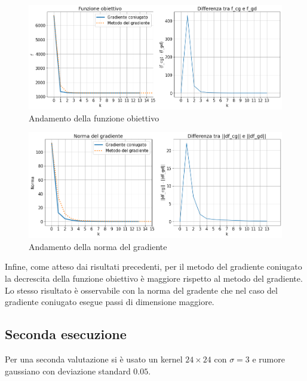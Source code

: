 \documentclass[11pt]{article}
\begin{document}
\begin{figure}[H]
    \centering
    \includegraphics[width=12cm]{iterazioni_cg_gd/1/funzione_obiettivo.png}
    \caption{Andamento della funzione obiettivo}
    \label{fig:obiettivo1}
\end{figure}
\begin{figure}[H]
    \centering
    \includegraphics[width=12cm]{iterazioni_cg_gd/1/norma_gradiente.png}
    \caption{Andamento della norma del gradiente}
    \label{fig:gradiente1}
\end{figure}
Infine, come atteso dai risultati precedenti, per il metodo del gradiente coniugato la decrescita della funzione obiettivo è maggiore rispetto al metodo del gradiente. 
Lo stesso risultato è osservabile con la norma del gradente che nel caso del gradiente coniugato esegue passi di dimensione maggiore.

\subsection{Seconda esecuzione}
Per una seconda valutazione si è usato un kernel $24 \times 24$ con $\sigma=3$ e rumore gaussiano con deviazione standard $0.05$.\\
\end{document}
